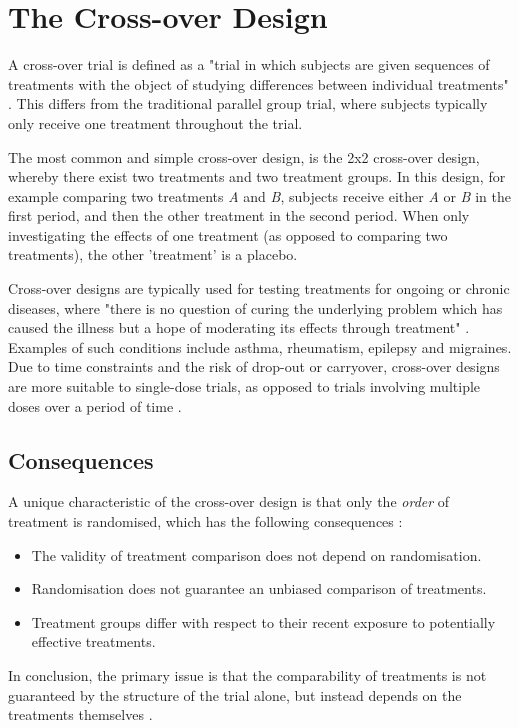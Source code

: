 \documentclass[12pt, TexShade, letterpaper]{report}
\begin{document}
\section{The Cross-over Design}
A cross-over trial is defined as a "trial in which subjects are given sequences of treatments with the object of studying differences between individual treatments" \cite{senn2002crossover}. This differs from the traditional parallel group trial, where subjects typically only receive one treatment throughout the trial.

The most common and simple cross-over design, is the 2x2 cross-over design, whereby there exist two treatments and two treatment groups. In this design, for example comparing two treatments \textit{A} and \textit{B}, subjects receive either \textit{A} or \textit{B} in the first period, and then the other treatment in the second period. When only investigating the effects of one treatment (as opposed to comparing two treatments), the other 'treatment' is a placebo.

Cross-over designs are typically used for testing treatments for ongoing or chronic diseases, where "there is no question of curing the underlying problem which has caused the illness but a hope of moderating its effects through treatment" \cite{senn2002crossover}. Examples of such conditions include asthma, rheumatism, epilepsy and migraines. Due to time constraints and the risk of drop-out or carryover, cross-over designs are more suitable to single-dose trials, as opposed to trials involving multiple doses over a period of time \cite{senn2002crossover}.

\subsection{Consequences}
A unique characteristic of the cross-over design is that only the \textit{order} of treatment is randomised, which has the following consequences \cite{piantadosi2005clinical}:
\begin{itemize}
    \item The validity of treatment comparison does not depend on randomisation.
    \item Randomisation does not guarantee an unbiased comparison of treatments.
    \item Treatment groups differ with respect to their recent exposure to potentially effective treatments.
\end{itemize}
In conclusion, the primary issue is that the comparability of treatments is not guaranteed by the structure of the trial alone, but instead depends on the treatments themselves \cite{piantadosi2005clinical}.
\end{document}
